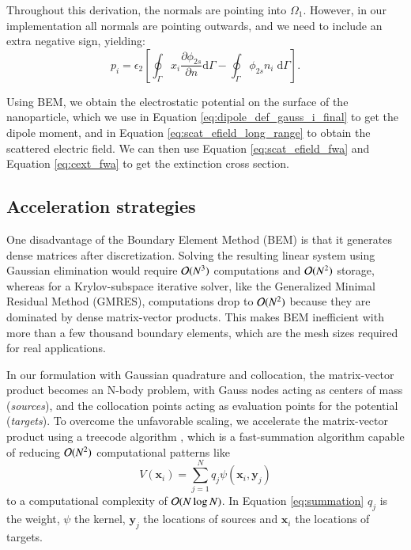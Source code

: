 %
Throughout this derivation, the normals are pointing into $\Omega_1$. However, in our implementation 
all normals are pointing outwards, and we need to include an extra negative sign, yielding:
%
\begin{equation} \label{eq:dipole_def_gauss_i_final}
{p_i} = \epsilon_2 \left[ \oint_\Gamma  x_i  \frac{\partial \phi_{2s}}{\partial n} \text{d}\Gamma - \oint_\Gamma \phi_{2s} n_i \; \text{d}\Gamma \right].
\end{equation}

Using BEM, we obtain the electrostatic potential on the surface of the nanoparticle, 
which we use in Equation \eqref{eq:dipole_def_gauss_i_final} to get the dipole 
moment, and in Equation \eqref{eq:scat_efield_long_range} to obtain the scattered
electric field. We can then use Equation \eqref{eq:scat_efield_fwa} and Equation 
\eqref{eq:cext_fwa} to get the extinction cross section.

\subsection{Acceleration strategies} \label{sec:acc_strategies}

One disadvantage of the Boundary Element Method (BEM) is that it generates dense matrices
after discretization. Solving the resulting linear system using
Gaussian elimination would require $\mathcal{O}(N^3)$ computations and $\mathcal{O}(N^2)$ storage, whereas for a
Krylov-subspace iterative solver, like the Generalized Minimal Residual Method (GMRES),
computations drop to $\mathcal{O}(N^2)$ because they are dominated by dense matrix-vector 
products. This makes BEM inefficient with more than a few thousand boundary elements,
which are the mesh sizes required for real applications. 

In our formulation with Gaussian quadrature and collocation, the matrix-vector product
becomes an N-body problem, with Gauss nodes acting as centers of mass (\emph{sources}), 
and the collocation points acting as evaluation points for the potential (\emph{targets}).
To overcome the unfavorable scaling,
we accelerate the matrix-vector product using a treecode algorithm \cite{BarnesHut1986,DuanKrasny2001}, 
which is a fast-summation algorithm capable of reducing $\mathcal{O}(N^2)$
computational patterns like
%
\begin{equation} \label{eq:summation}
V(\mathbf{x}_i) = \sum_{j=1}^{N} q_j \psi(\mathbf{x}_i, \mathbf{y}_j) 
\end{equation}
%
\noindent to a computational complexity of $\mathcal{O}(N \log N)$. In Equation \eqref{eq:summation} 
$q_j$ is the weight, $\psi$ the kernel, $\mathbf{y}_j$ the locations of sources and 
$\mathbf{x}_i$ the locations of targets.

